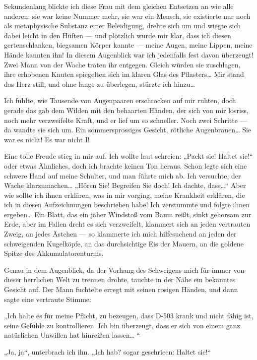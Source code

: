 Sekundenlang blickte ich diese Frau mit dem gleichen Entsetzen an
wie alle anderen: sie war keine Nummer mehr, sie war ein Mensch,
sie existierte nur noch als metaphysische Substanz einer
Beleidigung, drehte sich um und wiegte sich dabei leicht in den
Hüften — und plötzlich wurde mir klar, dass ich diesen
gertenschlanken, biegsamen Körper kannte — meine Augen, meine
Lippen, meine Hände kannten ihn! In diesem Augenblick war
ich jedenfalls fest davon überzeugt! Zwei Mann von der Wache traten
ihr entgegen. Gleich würden sie zuschlagen, ihre erhobenen Knuten
spiegelten sich im klaren Glas des Pflasters\ldots{} Mir stand das Herz
still, und ohne lange zu überlegen, stürzte ich hinzu\ldots{}

Ich fühlte, wie Tausende von Augenpaaren erschrocken auf mir
ruhten, doch gerade das gab dem Wilden mit den behaarten Händen,
der sich von mir losriss, noch mehr verzweifelte Kraft, und er lief
um so schneller. Noch zwei Schritte — da wandte sie sich um. Ein
sommersprossiges Gesicht, rötliche Augenbrauen\ldots{} Sie war es nicht!
Es war nicht I!

Eine tolle Freude stieg in mir auf. Ich wollte laut schreien:
„Packt sie! Haltet sie!“ oder etwas Ähnliches, doch ich brachte
keinen Ton heraus. Schon legte sich eine schwere Hand auf meine
Schulter, und man führte mich ab. Ich versuchte, der Wache
klarzumachen\ldots{} „Hören Sie! Begreifen Sie doch! Ich dachte,
dass\ldots{}“ Aber wie sollte ich ihnen erklären, was in mir vorging,
meine Krankheit erklären, die ich in diesen Aufzeichnungen
beschrieben habe! Ich verstummte und folgte ihnen ergeben\ldots{} Ein
Blatt, das ein jäher Windstoß vom Baum reißt, sinkt gehorsam zur
Erde, aber im Fallen dreht es sich verzweifelt, klammert sich an
jeden vertrauten Zweig, an jedes Ästchen — so klammerte ich mich
hilfesuchend an jeden der schweigenden Kugelköpfe, an das
durchsichtige Eis der Mauern, an die goldene Spitze des
Akkumulatorenturms.

Genau in dem Augenblick, da der Vorhang des Schweigens mich für
immer von dieser herrlichen Welt zu trennen drohte, tauchte in der
Nähe ein bekanntes Gesicht auf. Der Mann fuchtelte erregt mit
seinen rosigen Händen, und dann sagte eine vertraute Stimme:

„Ich halte es für meine Pflicht, zu bezeugen, dass D-503 krank und
nicht fähig ist, seine Gefühle zu kontrollieren. Ich bin überzeugt,
dass er sich von einem ganz natürlichen Unwillen hat hinreißen
lassen\ldots{} “

„Ja, ja“, unterbrach ich ihn. „Ich hab? sogar geschrieen: Haltet
sie!“

